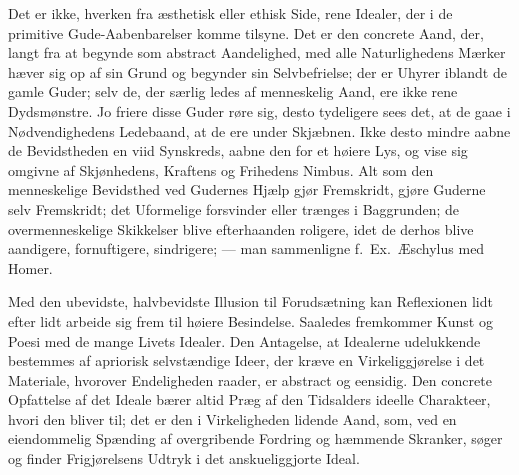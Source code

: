 \documentclass[12pt]{book}
\newcommand{\apage}[1]{\marginnote{\footnotesize\textit{[#1]}}}
\begin{document}
Det er ikke, hverken fra æsthetisk eller ethisk Side, rene Idealer, der i de
primitive Gude-Aabenbarelser komme tilsyne. Det er den concrete Aand, der,
langt fra at begynde som abstract Aandelighed, med alle Naturlighedens Mærker
hæver sig op af sin Grund og begynder sin Selvbefrielse; der er Uhyrer iblandt
de gamle Guder; selv de, der særlig ledes af menneskelig Aand, ere ikke rene
Dydsmønstre. Jo friere disse Guder røre sig, desto tydeligere sees det, at de
gaae i Nødvendighedens Ledebaand, at de ere under Skjæbnen. Ikke desto mindre
aabne de Bevidstheden en viid Synskreds, aabne den for et høiere Lys, og vise
sig omgivne af Skjønhedens, Kraftens og Frihedens Nimbus. Alt som den
menneskelige Bevidsthed ved Gudernes Hjælp gjør Fremskridt, gjøre Guderne selv
Fremskridt; det Uformelige forsvinder eller trænges i Baggrunden; de
overmenneskelige Skikkelser blive \apage{249} efterhaanden roligere, idet de derhos blive
aandigere, fornuftigere, sindrigere; --- man sammenligne f.\ Ex.\ Æschylus med
Homer.

Med den ubevidste, halvbevidste Illusion til Forudsætning kan Reflexionen lidt
efter lidt arbeide sig frem til høiere Besindelse. Saaledes fremkommer Kunst
og Poesi med de mange Livets Idealer. Den Antagelse, at Idealerne udelukkende
bestemmes af apriorisk selvstændige Ideer, der kræve en Virkeliggjørelse i det
Materiale, hvorover Endeligheden raader, er abstract og eensidig. Den concrete
Opfattelse af det Ideale bærer altid Præg af den Tidsalders ideelle Charakteer,
hvori den bliver til; det er den i Virkeligheden lidende Aand, som, ved en
eiendommelig Spænding af overgribende Fordring og hæmmende Skranker, søger og
finder Frigjørelsens Udtryk i det anskueliggjorte Ideal.
\end{document}
